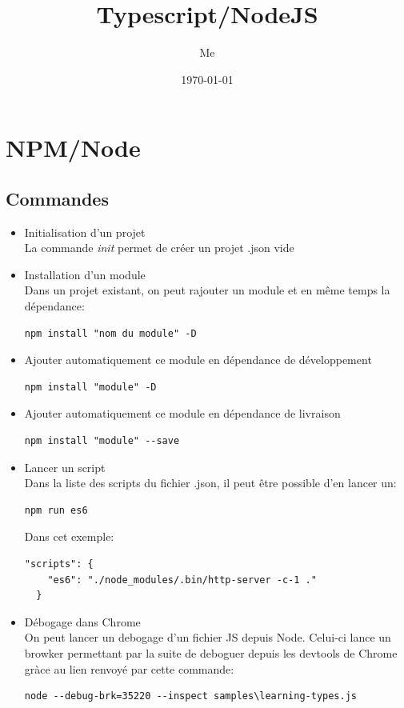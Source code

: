 \documentclass[12pt,oneside]{scrbook}
\title{Typescript/NodeJS}
\author{Me}
\date{\today}
\begin{document}
 
\maketitle 
\tableofcontents


\chapter{NPM/Node}
\section{Commandes}
\begin{itemize}
\item Initialisation d'un projet\\
La commande \textit{init} permet de créer un projet .json vide
\item Installation d'un module\\
Dans un projet existant, on peut rajouter un module et en même temps la dépendance:
\begin{verbatim}
npm install "nom du module" -D
\end{verbatim}
\item Ajouter automatiquement ce module en dépendance de développement
\begin{verbatim}
npm install "module" -D
\end{verbatim}
\item Ajouter automatiquement ce module en dépendance de livraison
\begin{verbatim}
npm install "module" --save
\end{verbatim}
\item Lancer un script\\
Dans la liste des scripts du fichier .json, il peut être possible d'en lancer un:
\begin{verbatim}
npm run es6
\end{verbatim}
Dans cet exemple:
\begin{verbatim}
"scripts": {
    "es6": "./node_modules/.bin/http-server -c-1 ."
  }
\end{verbatim}
\item Débogage dans Chrome\\
On peut lancer un debogage d'un fichier JS depuis Node. Celui-ci lance un browker permettant par la suite de deboguer depuis les devtools de Chrome gràce au lien renvoyé par cette commande:
\begin{verbatim}
node --debug-brk=35220 --inspect samples\learning-types.js
\end{verbatim}
\end{itemize}
\end{document}
